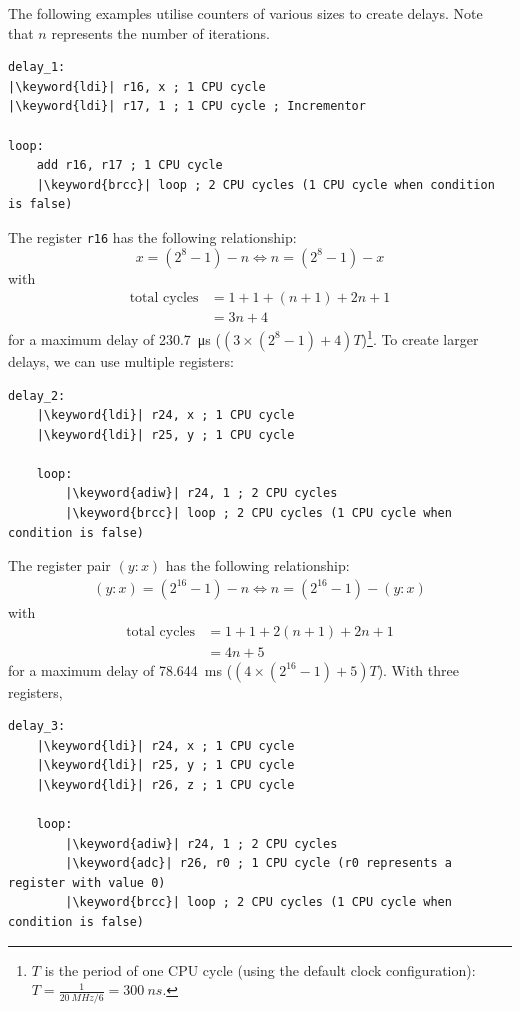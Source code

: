 \documentclass{report}
\newcommand{\keyword}[1]{\textcolor[rgb]{0.00,0.50,0.00}{\textbf{#1}}}
\begin{document}
The following examples utilise counters of various sizes to create delays.
Note that \(n\) represents the number of iterations.
\begin{verbatim}
delay_1:
|\keyword{ldi}| r16, x ; 1 CPU cycle
|\keyword{ldi}| r17, 1 ; 1 CPU cycle ; Incrementor

loop:
    add r16, r17 ; 1 CPU cycle
    |\keyword{brcc}| loop ; 2 CPU cycles (1 CPU cycle when condition is false)
\end{verbatim}
The register \texttt{r16} has the following relationship:
\begin{equation*}
x = \left( 2^8 - 1 \right) - n \iff n = \left( 2^8 - 1 \right) - x
\end{equation*}
with
\begin{align*}
    \text{total cycles} & = 1 + 1 + \left( n + 1 \right) + 2 n + 1 \\
                        & = 3 n + 4
\end{align*}
for a maximum delay of \qty{230.7}{\micro s} (\(\left( 3 \times \left( 2^8 - 1 \right) + 4 \right) T\))\footnote{\(T\) is the period of one CPU cycle (using the default clock configuration): \(T = \frac{1}{\qty{20}{MHz} / 6} = \qty{300}{ns}\).}.
To create larger delays, we can use multiple registers:
\begin{verbatim}
delay_2:
    |\keyword{ldi}| r24, x ; 1 CPU cycle
    |\keyword{ldi}| r25, y ; 1 CPU cycle

    loop:
        |\keyword{adiw}| r24, 1 ; 2 CPU cycles
        |\keyword{brcc}| loop ; 2 CPU cycles (1 CPU cycle when condition is false)
\end{verbatim}
The register pair \(\left( y:x \right)\) has the following relationship:
\begin{align*}
    \left( y:x \right) = \left( 2^{16} - 1 \right) - n \iff n = \left( 2^{16} - 1 \right) - \left( y:x \right)
\end{align*}
with
\begin{align*}
    \text{total cycles} & = 1 + 1 + 2 \left( n + 1 \right) + 2 n + 1 \\
                        & = 4n + 5
\end{align*}
for a maximum delay of \qty{78.644}{ms} (\(\left(4 \times \left( 2^{16} - 1 \right) + 5 \right) T\)).
With three registers,
\begin{verbatim}
delay_3:
    |\keyword{ldi}| r24, x ; 1 CPU cycle
    |\keyword{ldi}| r25, y ; 1 CPU cycle
    |\keyword{ldi}| r26, z ; 1 CPU cycle

    loop:
        |\keyword{adiw}| r24, 1 ; 2 CPU cycles
        |\keyword{adc}| r26, r0 ; 1 CPU cycle (r0 represents a register with value 0)
        |\keyword{brcc}| loop ; 2 CPU cycles (1 CPU cycle when condition is false)
\end{verbatim}
\end{document}
